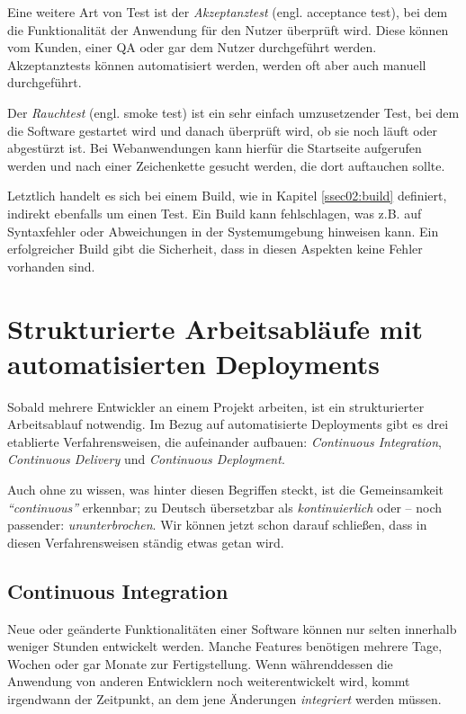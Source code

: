 Eine weitere Art von Test ist der \emph{Akzeptanztest} (engl. acceptance test), bei dem die Funktionalität der Anwendung für den Nutzer überprüft wird. Diese können vom Kunden, einer \ac{QA} oder gar dem Nutzer durchgeführt werden. Akzeptanztests können automatisiert werden, werden oft aber auch manuell durchgeführt.

Der \emph{Rauchtest} (engl. smoke test) ist ein sehr einfach umzusetzender Test, bei dem die Software gestartet wird und danach überprüft wird, ob sie noch läuft oder abgestürzt ist. Bei Webanwendungen kann hierfür die Startseite aufgerufen werden und nach einer Zeichenkette gesucht werden, die dort auftauchen sollte.

Letztlich handelt es sich bei einem Build, wie in Kapitel \ref{ssec02:build} definiert, indirekt ebenfalls um einen Test. Ein Build kann fehlschlagen, was z.B. auf Syntaxfehler oder Abweichungen in der Systemumgebung hinweisen kann. Ein erfolgreicher Build gibt die Sicherheit, dass in diesen Aspekten keine Fehler vorhanden sind.


\section{Strukturierte Arbeitsabläufe mit automatisierten Deployments}

Sobald mehrere Entwickler an einem Projekt arbeiten, ist ein strukturierter Arbeitsablauf notwendig. Im Bezug auf automatisierte Deployments gibt es drei etablierte Verfahrensweisen, die aufeinander aufbauen: \emph{Continuous Integration}, \emph{Continuous Delivery} und \emph{Continuous Deployment}.

Auch ohne zu wissen, was hinter diesen Begriffen steckt, ist die Gemeinsamkeit \emph{``continuous''} erkennbar; zu Deutsch übersetzbar als \emph{kontinuierlich} oder – noch passender: \emph{ununterbrochen}. Wir können jetzt schon darauf schließen, dass in diesen Verfahrensweisen ständig etwas getan wird.

\subsection{Continuous Integration}

Neue oder geänderte Funktionalitäten einer Software können nur selten innerhalb weniger Stunden entwickelt werden. Manche Features benötigen mehrere Tage, Wochen oder gar Monate zur Fertigstellung. Wenn während\-dessen die Anwendung von anderen Entwicklern noch weiterentwickelt wird, kommt irgendwann der Zeitpunkt, an dem jene Änderungen \emph{integriert} werden müssen.

